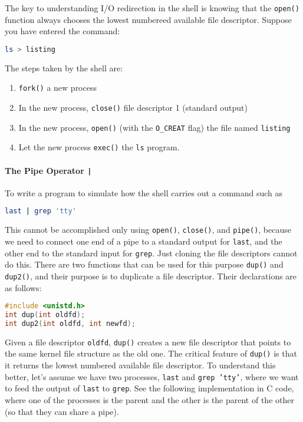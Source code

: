 \documentclass{article}
\newcommand{\code}[1]{\texttt{#1}}
\begin{document}
The key to understanding I/O redirection in the shell is knowing that the \code{open()} function always chooses the lowest numbereed available file descriptor. Suppose you have entered the command: 

\begin{lstlisting}[language=bash]
ls > listing
\end{lstlisting}

The steps taken by the shell are:

\begin{enumerate}
    \item \code{fork()} a new process
    \item In the new process, \code{close()} file descriptor 1 (standard output)
    \item In the new process, \code{open()} (with the \code{O\_CREAT} flag) the file named \code{listing}
    \item Let the new process \code{exec()} the \code{ls} program. 
\end{enumerate}

\paragraph{The Pipe Operator \code{|}}

To write a program to simulate how the shell carries out a command such as 

\begin{lstlisting}[language=bash]
last | grep 'tty'
\end{lstlisting}

This cannot be accomplished only using \code{open()}, \code{close()}, and \code{pipe()}, because we need to connect one end of a pipe to a standard output for \code{last}, and the other end to the standard input for \code{grep}. Just cloning the file descriptors cannot do this. There are two functions that can be used for this purpose \code{dup()} and \code{dup2()}, and their purpose is to duplicate a file descriptor. Their declarations are as follows: 

\begin{lstlisting}[language=C]
#include <unistd.h>
int dup(int oldfd);
int dup2(int oldfd, int newfd);
\end{lstlisting}

Given a file descriptor \code{oldfd}, \code{dup()} creates a new file descriptor that points to the same kernel file structure as the old one. The critical feature of \code{dup()} is that it returns the lowest numbered available file descriptor. To understand this better, let's assume we have two processes, \code{last} and \code{grep 'tty'}, where we want to feed the output of \code{last} to \code{grep}. See the following implementation in C code, where one of the processes is the parent and the other is the parent of the other (so that they can share a pipe). 
\end{document}
